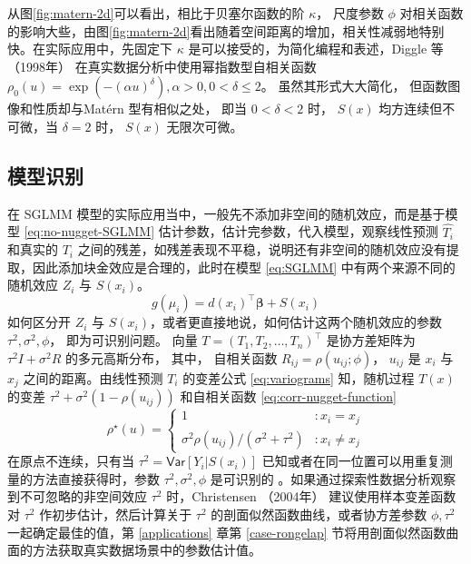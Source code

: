 \documentclass[12pt,a4paper,UTF8,twoside]{book}
\theoremstyle{definition}
\theoremstyle{definition}
\theoremstyle{definition}
\theoremstyle{remark}
\begin{document}
从图\ref{fig:matern-2d}可以看出，相比于贝塞尔函数的阶 \(\kappa\)，
尺度参数 \(\phi\)
对相关函数的影响大些，由图\ref{fig:matern-2d}看出随着空间距离的增加，相关性减弱地特别快。在实际应用中，先固定下
\(\kappa\) 是可以接受的，为简化编程和表述，Diggle 等 （1998年）
\citep{Diggle1998} 在真实数据分析中使用幂指数型自相关函数
\(\rho_{0}(u) = \exp(-(\alpha u)^{\delta}), \alpha > 0, 0 < \delta \leq 2\)。
虽然其形式大大简化， 但函数图像和性质却与Matérn 型有相似之处， 即当
\(0 < \delta < 2\) 时， \(S(x)\) 均方连续但不可微，当 \(\delta = 2\)
时， \(S(x)\) 无限次可微。

\hypertarget{subsec:identify}{%
\subsection{模型识别}\label{subsec:identify}}

在 SGLMM 模型的实际应用当中，一般先不添加非空间的随机效应，而是基于模型
\eqref{eq:no-nugget-SGLMM} 估计参数，估计完参数，代入模型，观察线性预测
\(\hat{T_{i}}\) 和真实的 \(T_i\)
之间的残差，如残差表现不平稳，说明还有非空间的随机效应没有提取，因此添加块金效应是合理的，此时在模型
\eqref{eq:SGLMM} 中有两个来源不同的随机效应 \(Z_{i}\) 与 \(S(x_i)\)。
\begin{equation}
g(\mu_i) = d(x_i)^{\top}\boldsymbol{\beta} + S(x_i) \label{eq:no-nugget-SGLMM}
\end{equation} 如何区分开 \(Z_{i}\) 与
\(S(x_i)\)，或者更直接地说，如何估计这两个随机效应的参数
\(\tau^2, \sigma^2, \phi\)， 即为可识别问题。 向量
\(T = (T_1,T_2,\ldots,T_n)^{\top}\) 是协方差矩阵为
\(\tau^2I + \sigma^2R\) 的多元高斯分布， 其中， 自相关函数
\(R_{ij} = \rho(u_{ij}; \phi)\)， \(u_{ij}\) 是 \(x_i\) 与 \(x_j\)
之间的距离。由线性预测 \(T_{i}\) 的变差公式 \eqref{eq:variograms}
知，随机过程 \(T(x)\) 的变差 \(\tau^2 + \sigma^2(1-\rho(u_{ij}))\)
和自相关函数 \eqref{eq:corr-nugget-function} \begin{equation}
\rho^{\star}(u) =
\begin{cases}
                                     1 & : x_{i} = x_{j}  \\
\sigma^2\rho(u_{ij})/(\sigma^2+\tau^2) & : x_{i} \neq x_{j}
\end{cases} \label{eq:corr-nugget-function}
\end{equation} \noindent 在原点不连续，只有当
\(\tau^2 = \mathsf{Var}[Y_i|S(x_i)]\)
已知或者在同一位置可以用重复测量的方法直接获得时，参数
\(\tau^2, \sigma^2, \phi\) 是可识别的
\citep{Diggle2002Childhood, Diggle2007}。如果通过探索性数据分析观察到不可忽略的非空间效应
\(\tau^2\) 时，Christensen （2004年） \citep{Christensen2004}
建议使用样本变差函数对 \(\tau^2\) 作初步估计，然后计算关于 \(\tau^2\)
的剖面似然函数曲线，或者协方差参数 \(\phi,\tau^2\)一起确定最佳的值，第
\ref{applications} 章第 \ref{case-rongelap}
节将用剖面似然函数曲面的方法获取真实数据场景中的参数估计值。
\end{document}
